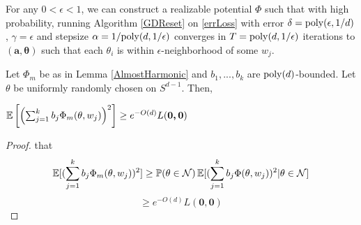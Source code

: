 \begin{theorem}
For any $0 < \epsilon < 1$, we can construct a realizable potential $\Phi$ such that with high probability, running Algorithm \ref{GDReset} on \eqref{errLoss} with error $\delta = \mathrm{poly}(\epsilon,1/d)$, $\gamma = \epsilon$ and stepsize $\alpha = 1/\mathrm{poly}(d,1/\epsilon)$ converges in $T = \mathrm{poly}(d, 1/\epsilon)$ iterations to $(\boldsymbol{a,\theta})$ such that each $\theta_i$ is within $\epsilon$-neighborhood of some $w_j$.
\end{theorem}






\begin{lemma}\label{bigVariance}
Let $\Phi_m$ be as in Lemma \ref{AlmostHarmonic} and $b_1,...,b_k$ are $\mathrm{poly}(d)$-bounded. Let $\theta$ be uniformly randomly chosen on $S^{d-1}$. Then,
 
 $\operatorname*{\mathbb{E}}\left[\left(  \sum_{j=1}^k b_j \Phi_m(\theta,w_j)\right)^2\right]
 \geq e^{-O(d)}L(\boldsymbol{0,0})$
\end{lemma}
\begin{proof}
 that 
\[\operatorname*{\mathbb{E}}[(  \sum_{j=1}^k b_j \Phi_m(\theta,w_j))^2]
 \geq \operatorname*{\mathbb{P}}(\theta \in \mathcal{N})\operatorname*{\mathbb{E}}[(\sum_{j=1}^k b_j \Phi(\theta, w_j))^2 | \theta \in \mathcal{N}]\]
\[\geq e^{-O(d)} L(\boldsymbol{0,0})\]
\end{proof}
\fi


